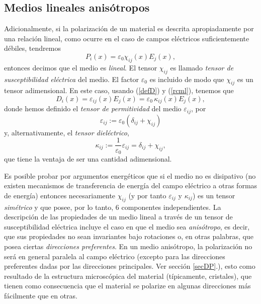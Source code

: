 \subsection{Medios lineales anisótropos}\label{sec:aniso}

Adicionalmente, si la polarización de un material es descrita apropiadamente
por una relación lineal, como ocurre en el caso de campos eléctricos
suficientemente débiles, tendremos
\begin{equation}
\boxed{P_i(x)=\varepsilon_0\chi_{ij}(x)E_j(x),} \label{rcml}
\end{equation}
entonces decimos que el medio es \textit{lineal}. El tensor $\chi_{ij}$ es
llamado \textit{tensor de susceptibilidad eléctrica} del medio.  El factor $\varepsilon_0$ es incluido de modo que $\chi_{ij}$ es un tensor adimensional. En este caso,
usando (\ref{defD}) y (\ref{rcml}), tenemos que
\begin{equation}\label{rclai}
\boxed{D_i(x)=\varepsilon_{ij}(x)E_j(x)=\varepsilon_0\,\kappa_{ij}(x)E_j(x),}
\end{equation}
donde hemos definido el \textit{tensor de permitividad} del medio
$\varepsilon_{ij}$, por
\begin{equation}
\varepsilon_{ij}:=\varepsilon_0(\delta_{ij}+\chi_{ij})
\end{equation}
y, alternativamente,  el \textit{tensor dieléctrico},
\begin{equation}
\kappa_{ij}:=\frac{1}{\varepsilon_0}\varepsilon_{ij}=\delta_{ij}+\chi_{ij},
\end{equation}
que tiene la ventaja de ser una cantidad adimensional.

Es posible probar por
argumentos energéticos que si el medio no es disipativo (no existen mecanismos
de transferencia de energía del campo eléctrico a otras formas de energía)
entonces necesariamente $\chi_{ij}$ (y por tanto $\varepsilon_{ij}$ y
$\kappa_{ij}$) es un tensor \textit{simétrico} y que posee, por lo
tanto, 6 componentes independientes. La descripción de las
propiedades de un medio lineal a través de un tensor de susceptibilidad
eléctrica incluye el caso en que el medio sea \textit{anisótropo}, es decir,
que sus propiedades no sean invariantes bajo rotaciones o, en otras palabras,
que posea ciertas \textit{direcciones preferentes}. En un medio anisótropo, la
polarización no será en general paralela al campo eléctrico (excepto para las
direcciones preferentes dadas por las direcciones principales. Ver sección
\ref{secDP}.), esto como
resultado de la estructura microscópica del material (típicamente, cristales),
que tienen como consecuencia que el material se polarize en algunas direcciones
más fácilmente que en otras.


